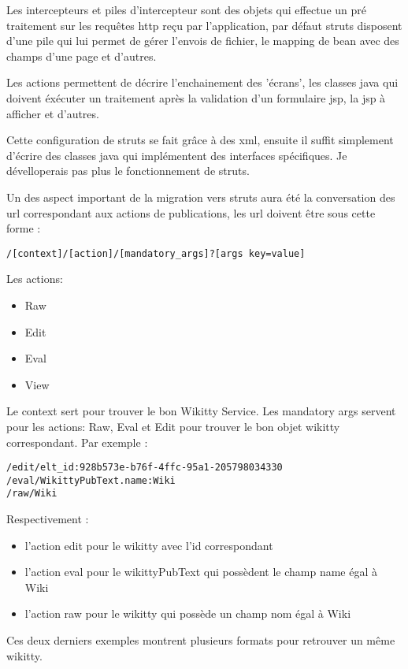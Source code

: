 Les intercepteurs et piles d'intercepteur sont des objets qui effectue un pré
traitement sur les requêtes http reçu par l'application, par défaut struts
disposent d'une pile qui lui permet de gérer l'envois de fichier, le mapping
de bean avec des champs d'une page et d'autres.

Les actions permettent de décrire l'enchainement des 'écrans', les classes java
qui doivent éxécuter un traitement après la validation d'un formulaire jsp, la
jsp à afficher et d'autres.

Cette configuration de struts se fait grâce à des xml, ensuite il suffit
simplement d'écrire des classes java qui implémentent des interfaces
spécifiques. Je dévelloperais pas plus le fonctionnement de struts.

Un des aspect important de la migration vers struts aura été la conversation des
url correspondant aux actions de publications, les url doivent être sous cette
forme : 
\begin{verbatim}
/[context]/[action]/[mandatory_args]?[args key=value]
\end{verbatim}

Les actions: 
\begin{itemize}
\item Raw
\item Edit
\item Eval
\item View
\end{itemize}

Le context sert pour trouver le bon Wikitty Service. Les mandatory args servent
pour les actions: Raw, Eval et Edit pour trouver le bon objet wikitty
correspondant. Par exemple :

\begin{verbatim}
/edit/elt_id:928b573e-b76f-4ffc-95a1-205798034330 
/eval/WikittyPubText.name:Wiki
/raw/Wiki
\end{verbatim}

Respectivement :
\begin{itemize}
\item l'action edit pour le wikitty avec l'id correspondant
\item l'action eval pour le wikittyPubText qui possèdent le champ name égal à
Wiki
\item l'action raw pour le wikitty qui possède un champ nom égal à Wiki
\end{itemize}

Ces deux derniers exemples montrent plusieurs formats pour retrouver un même
wikitty. 

